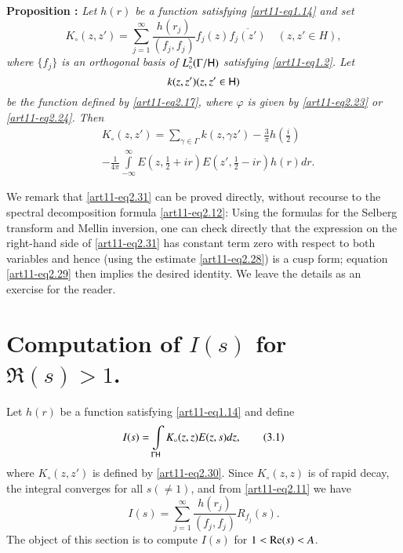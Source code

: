 \medskip
\noindent
{\bfseries Proposition :\label{art11-prop3}}
\textit{Let $h(r)$ be a function satisfying \eqref{art11-eq1.14} and set}
\begin{equation*}
K_\circ (z, z') = \sum\limits^\infty_{j=1} \frac{h(r_j)}{(f_j, f_j)} f_j (z) \overline{f_j (z')} \quad (z, z' \in H), 
\tag{2.30}\label{art11-eq2.30}
\end{equation*}
\textit{where $\{f_j\}$ is an orthogonal basis of $L^2_\circ (\Gamma / \mathsf{H})$ satisfying \eqref{art11-eq1.2}. Let 
$$
k(z,z') (z, z' \in \mathsf{H})
$$ 
be the function defined by \eqref{art11-eq2.17}, where $\varphi$ is given by \eqref{art11-eq2.23} or \eqref{art11-eq2.24}. Then}  
\begin{align*}
& K_\circ (z,z') =\sum\limits_{\gamma \in \Gamma} k (z, \gamma z') - \frac{3}{\pi} h (\frac{i}{2}) \tag{2.31} \label{art11-eq2.31}\\
& -\frac{1}{4\pi} \int\limits^\infty_{-\infty} E (z, \frac{1}{2} + ir) E (z', \frac{1}{2} - ir) h (r) dr. 
\end{align*}

We remark that \eqref{art11-eq2.31} can be proved directly, without recourse to the spectral decomposition formula \eqref{art11-eq2.12}: Using the formulas for the Selberg transform and Mellin inversion, one can check directly that the expression on the right-hand side of \eqref{art11-eq2.31} has constant term zero with respect to both variables and hence (using the estimate \eqref{art11-eq2.28}) is a cusp form; equation \eqref{art11-eq2.29} then implies the desired identity. We leave the details as an exercise for the reader. 

\section{Computation of $I(s)$ for $\Re (s) >1$.}\label{art11-sec3}
Let $h(r)$ be a function satisfying \eqref{art11-eq1.14} and define 
\begin{equation*}
I(s) = \int\limits_{\Gamma \mathsf{H}} K_\circ (z, z) E (z, s) dz,  \tag{3.1}\label{art11-eq3.1}
\end{equation*}
where $K_\circ (z,z')$ is defined by \eqref{art11-eq2.30}. Since $K_\circ (z,z)$ is of rapid decay, the integral converges for all $s(\neq 1)$, and from \eqref{art11-eq2.11} we have 
\begin{equation*}
I(s) = \sum\limits^\infty_{j=1}  \frac{h(r_j)}{(f_j , f_j)} R_{f_j} (s) . \tag{3.2}\label{art11-eq3.2}
\end{equation*}
The object of this section is to compute $I(s)$ for $1 < \operatorname{Re} (s) < A$. 

